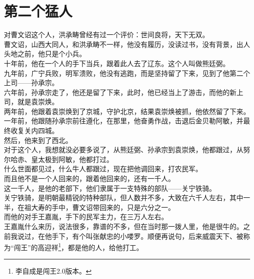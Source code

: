 \section{第二个猛人}
\ifnum{}
	\begin{multicols}{\theparacolNo}
\fi
对曹文诏这个人，洪承畴曾经有过一个评价：世间良将，天下无双。\\

曹文诏，山西大同人，和洪承畴不一样，他没有履历，没读过书，没有背景，出人头地之前，他只是个小兵。\\

十年前，他在一个人的手下当兵，跟着此人去了辽东。这个人叫做熊廷弼。\\

九年前，广宁兵败，明军溃败，他没有逃跑，而是坚持留了下来，见到了他第二个上司——孙承宗。\\

六年前，孙承宗走了，他还是留了下来，此时，他已经当上了游击，而他的新上司，就是袁崇焕。\\

两年前，他跟着袁崇焕到了京城，守护北京，结果袁崇焕被抓，他依然留了下来。\\

一年前，他跟随孙承宗前往遵化，在那里，他奋勇作战，击退后金贝勒阿敏，并最终收复关内四城。\\

然后，他来到了西北。\\

对于这个人，我想就没必要多说了，从熊廷弼、孙承宗到袁崇焕，他都跟过，从努尔哈赤、皇太极到阿敏，他都打过。\\

什么世面都见过，什么牛人都跟过，现在把他调回来，打农民军。\\

而且他不是一个人回来的，跟着他回来的，还有一千人。\\

这一千人，是他的老部下，他们隶属于一支特殊的部队——关宁铁骑。\\

关宁铁骑，是明朝最精锐的特种部队，但人数并不多，大致在六千人左右，其中一半，在祖大寿的手中，曹文诏带回来的，只是六分之一。\\

而他的对手王嘉胤，手下的民军主力，在三万人左右。\\

王嘉胤什么来历，说法很多，靠谱的不多，但在当时那一拨人里，他是很牛的。之前我说过，在他手下，有个叫张献忠的小喽罗。顺便再说句，后来威震天下、被称为“闯王”的高迎祥\footnote{李自成是闯王2.0版本。}，都是他的人，给他打工。\\


\end{multicols}
